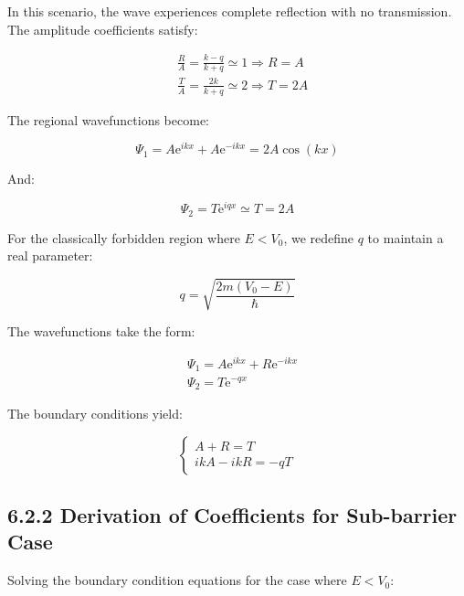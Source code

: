 \documentclass[italian]{HKNdocument}
\begin{document}
In this scenario, the wave experiences complete reflection with no transmission. The amplitude coefficients satisfy:

\begin{align*}
& \frac{R}{A}=\frac{k-q}{k+q} \simeq 1 \Longrightarrow R=A  \tag{6.34}\\
& \frac{T}{A}=\frac{2 k}{k+q} \simeq 2 \Longrightarrow T=2 A
\end{align*}

The regional wavefunctions become:

\begin{equation*}
\Psi_{1}=A \mathrm{e}^{i k x}+A \mathrm{e}^{-i k x}=2 A \cos (k x) \tag{6.35}
\end{equation*}

And:

\begin{equation*}
\Psi_{2}=T \mathrm{e}^{i q x} \simeq T=2 A \tag{6.36}
\end{equation*}

For the classically forbidden region where $E<V_{0}$, we redefine $q$ to maintain a real parameter:

\begin{equation*}
q=\sqrt{\frac{2 m\left(V_{0}-E\right)}{\hbar}} \tag{6.37}
\end{equation*}

The wavefunctions take the form:

\begin{align*}
& \Psi_{1}=A \mathrm{e}^{i k x}+R \mathrm{e}^{-i k x} \\
& \Psi_{2}=T \mathrm{e}^{-q x} \tag{6.38}
\end{align*}

The boundary conditions yield:

\[
\left\{\begin{array}{l}
A+R=T  \tag{6.39}\\
i k A-i k R=-q T
\end{array}\right.
\]


\subsection*{6.2.2 Derivation of Coefficients for Sub-barrier Case}

Solving the boundary condition equations for the case where $E<V_0$:
\end{document}
